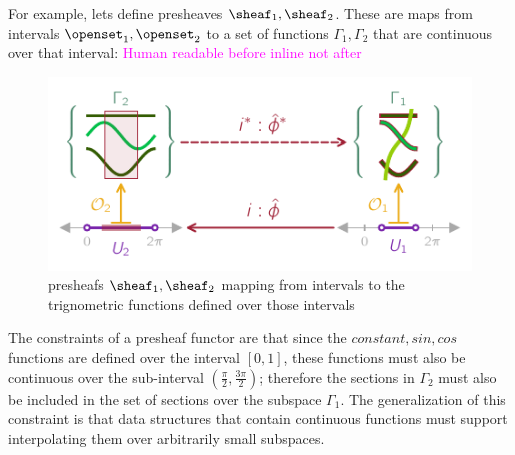 \documentclass[journal]{IEEEtran}
\newcommand{\note}[1]{\textcolor{magenta}{#1}}
\theoremstyle{definition}
\theoremstyle{remark}
\begin{document}
For example, lets define presheaves $\sheaf_1, \sheaf_2$. These are maps from intervals $\openset_1, \openset_2$ to a set of functions $\Gamma_1, \Gamma_2$ that are continuous over that interval: 
\note{Human readable before inline not after}

\begin{figure}[H]
  \includegraphics*[width=1\columnwidth]{figures/tex/presheaf.pdf}
  \caption*{presheafs $\sheaf_1, \sheaf_2$ mapping from intervals to the trignometric functions defined over those intervals }
\end{figure}

The constraints of a presheaf functor are that since the $constant, sin, cos$ functions are defined over the interval $\left[0,1\right]$, these functions must also be continuous over the sub-interval $\left(\frac{\pi}{2}, \frac{3\pi}{2}\right)$; therefore the sections in $\Gamma_{2}$ must also be included in the set of sections over the subspace $\Gamma_{1}$. The generalization of this constraint is that data structures that contain continuous functions must support interpolating them over arbitrarily small subspaces. 
\end{document}

